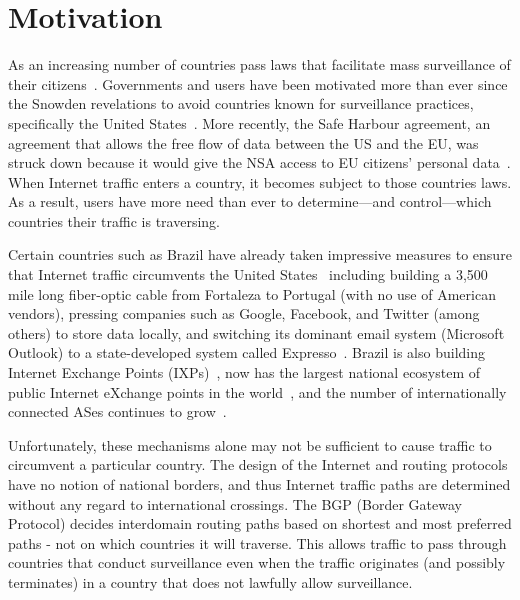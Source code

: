\section{Motivation}

As an increasing number of countries pass laws that facilitate mass
surveillance of their citizens~\cite{france_surveillance,
  netherlands_surveillance, kazak_surveillance, uk_bill}.  Governments
and users have been motivated more than ever since the Snowden
revelations to avoid countries known for surveillance practices,
specifically the United States~\cite{russia_secure_internet,
  routing_errors, dte}.  More recently, the Safe Harbour agreement, an
agreement that allows the free flow of data between the US and the EU,
was struck down because it would give the NSA access to EU citizens'
personal data~\cite{safe_harbour_illegal, safe_harbour_undecided}.  When
Internet traffic enters a country, it becomes subject to those countries
laws.  As a result, users have more need than ever to determine---and
control---which countries their traffic is traversing.

Certain countries such as Brazil have already taken impressive measures
to ensure that Internet traffic circumvents the United
States~\cite{brazil_history, brazil_break_from_US, brazil_conference,
  brazil_conference2, brazil_human_rights} including building a 3,500
mile long fiber-optic cable from Fortaleza to Portugal (with no use of
American vendors), pressing companies such as Google, Facebook, and
Twitter (among others) to store data locally, and switching its dominant
email system (Microsoft Outlook) to a state-developed system called
Expresso~\cite{brazil_cable, brazil_us_companies}.  Brazil is also
building Internet Exchange Points (IXPs)~\cite{brazil_IXP1}, now has the
largest national ecosystem of public Internet eXchange points in the
world~\cite{brazil_ixp_ecosystem}, and the number of internationally
connected ASes continues to grow~\cite{brazil_international_ases}.

Unfortunately, these mechanisms alone may not be sufficient to cause
traffic to circumvent a particular country. The design of the Internet
and routing protocols have no notion of national borders, and thus
Internet traffic paths are determined without any regard to
international crossings.  The BGP (Border Gateway Protocol) decides
interdomain routing paths based on shortest and most preferred paths -
not on which countries it will traverse.  This allows traffic to pass
through countries that conduct surveillance even when the traffic
originates (and possibly terminates) in a country that does not lawfully
allow surveillance.

